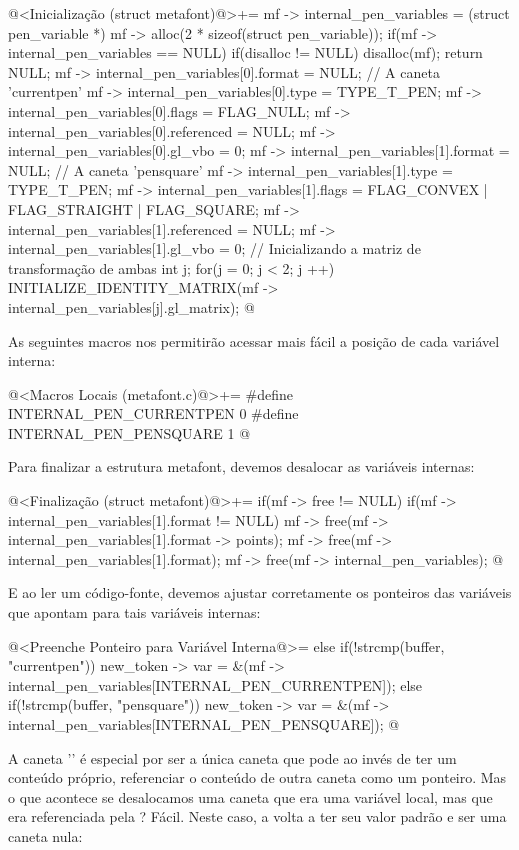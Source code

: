 \iniciocodigo
@<Inicialização (struct metafont)@>+=
mf -> internal_pen_variables = (struct pen_variable *)
                                 mf -> alloc(2 * sizeof(struct pen_variable));
if(mf -> internal_pen_variables == NULL){
  if(disalloc != NULL)
    disalloc(mf);
  return NULL;
}
mf -> internal_pen_variables[0].format = NULL; // A caneta 'currentpen'
mf -> internal_pen_variables[0].type = TYPE_T_PEN;
mf -> internal_pen_variables[0].flags = FLAG_NULL;
mf -> internal_pen_variables[0].referenced = NULL;
mf -> internal_pen_variables[0].gl_vbo = 0;
mf -> internal_pen_variables[1].format = NULL; // A caneta 'pensquare'
mf -> internal_pen_variables[1].type = TYPE_T_PEN;
mf -> internal_pen_variables[1].flags = FLAG_CONVEX | FLAG_STRAIGHT |
                                        FLAG_SQUARE;
mf -> internal_pen_variables[1].referenced = NULL;
mf -> internal_pen_variables[1].gl_vbo = 0;
{ // Inicializando a matriz de transformação de ambas
  int j;
  for(j = 0; j < 2; j ++)
    INITIALIZE_IDENTITY_MATRIX(mf -> internal_pen_variables[j].gl_matrix);
}
@
\fimcodigo

As seguintes macros nos permitirão acessar mais fácil a posição de
cada variável interna:

\iniciocodigo
@<Macros Locais (metafont.c)@>+=
#define INTERNAL_PEN_CURRENTPEN 0
#define INTERNAL_PEN_PENSQUARE  1
@
\fimcodigo

Para finalizar a estrutura metafont, devemos desalocar as variáveis
internas:

\iniciocodigo
@<Finalização (struct metafont)@>+=
if(mf -> free != NULL){
  if(mf -> internal_pen_variables[1].format != NULL){
    mf -> free(mf -> internal_pen_variables[1].format -> points);
    mf -> free(mf -> internal_pen_variables[1].format);
  }
  mf -> free(mf -> internal_pen_variables);
}
@
\fimcodigo

E ao ler um código-fonte, devemos ajustar corretamente os ponteiros
das variáveis que apontam para tais variáveis internas:

\iniciocodigo
@<Preenche Ponteiro para Variável Interna@>=
else if(!strcmp(buffer, "currentpen"))
  new_token -> var =
          &(mf -> internal_pen_variables[INTERNAL_PEN_CURRENTPEN]);
else if(!strcmp(buffer, "pensquare"))
  new_token -> var =
          &(mf -> internal_pen_variables[INTERNAL_PEN_PENSQUARE]);
@
\fimcodigo

A caneta '' é especial por ser a única caneta
que pode ao invés de ter um conteúdo próprio, referenciar o conteúdo
de outra caneta como um ponteiro. Mas o que acontece se desalocamos
uma caneta que era uma variável local, mas que era referenciada
pela ? Fácil. Neste caso,
a  volta a ter seu valor padrão e ser uma
caneta nula:

